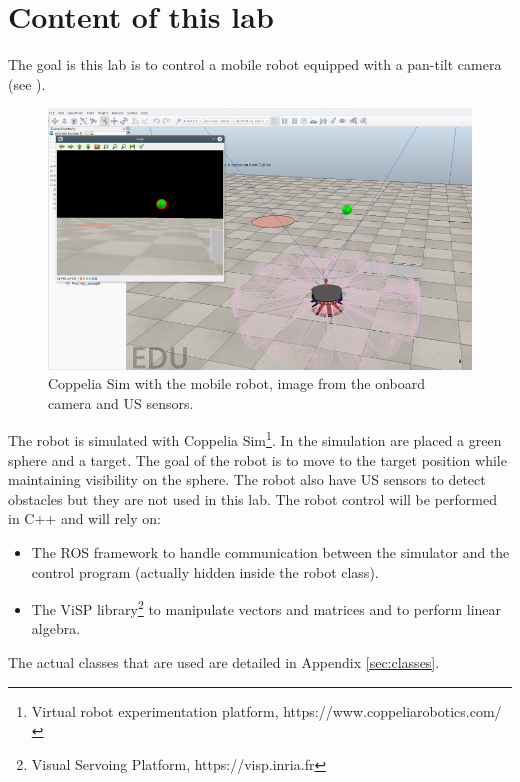 \documentclass{ecnreport}
\begin{document}




\section{Content of this lab}

The goal is this lab is to control a mobile robot equipped with a pan-tilt camera 
 (see ).

\begin{figure}[h!]\centering
 \includegraphics[width=.8\linewidth]{vrep}
 \caption{Coppelia Sim with the mobile robot, image from the onboard camera and US sensors.}
 \label{fig:vrep}
\end{figure}

The robot is simulated with Coppelia Sim\footnote{Virtual robot experimentation platform, https://www.coppeliarobotics.com/}.
In the simulation are placed a green sphere and a target. The goal of the robot is to move to the target position while maintaining visibility on the sphere. The robot also have US sensors
to detect obstacles but they are not used in this lab.
The robot control will be performed in C++ and will rely on:

\begin{itemize}
 \item The ROS framework to handle communication between the simulator and the control program (actually hidden inside the robot class).
 \item The ViSP library\footnote{Visual Servoing Platform, https://visp.inria.fr} to manipulate vectors and matrices and to perform linear algebra.
\end{itemize}
The actual classes that are used are detailed in Appendix \ref{sec:classes}.\\
\end{document}
